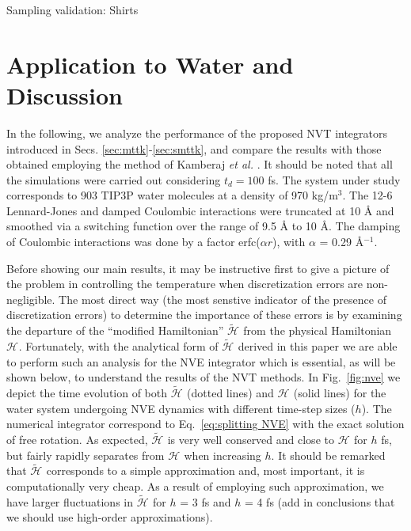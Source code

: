 \documentclass[
journal=jctcce,
layout=twocolumn
]{achemso}
\newcommand{\Ham}[1]{{\mathcal H}_\text{#1}}    %
\newcommand{\timestep}{h}
\newcommand{\modified}[1]{\widetilde{#1}}
\begin{document}
Sampling validation: Shirts \cite{Shirts_2013}

\section{Application to Water and Discussion}
\label{sec:numerical_results}

In the following, we analyze the performance of the proposed NVT integrators introduced in Secs. \ref{sec:mttk}-\ref{sec:smttk}, and  compare the results with those obtained employing the method of Kamberaj \textit{et al.} \cite{Kamberaj_2005}.  It should be noted that all the simulations were carried out considering $t_d = 100$ fs.
The system under study corresponds to 903 TIP3P\cite{Jorgensen_1983} water molecules at a density of 970 kg/m$^3$.
The 12-6 Lennard-Jones and damped Coulombic interactions were truncated at  10 {\AA} and smoothed via a switching function over the range of 9.5 {\AA} to  10 {\AA}.\cite{Silveira_2017} 
The damping of Coulombic interactions was done by a factor erfc($\alpha r$), with $\alpha$ = 0.29 {\AA}$^{-1}$.

Before showing our main results, it may be instructive first to give a picture of the problem in controlling the temperature when discretization errors are non-negligible. 
The most direct way (the most senstive indicator of the presence of discretization errors) to determine the importance of these errors is by examining the departure of the ``modified Hamiltonian'' $\modified{\Ham{}}$ from the physical Hamiltonian $\Ham{}$\cite{Engle_2005}. 
Fortunately, with the analytical form of $\modified{\Ham{}}$ derived in this paper we are able to perform such an analysis for the NVE integrator which is essential, as will be shown below, to understand the results of the NVT methods. 
In Fig.~\ref{fig:nve} we depict the time evolution of both $\modified{\Ham{}}$ (dotted lines) and $\Ham{}$ (solid lines) for the water system undergoing NVE dynamics with different time-step sizes ($\timestep$).
The numerical integrator correspond to Eq.~\ref{eq:splitting NVE} with the exact solution of free rotation. 
As expected, $\modified{\Ham{}}$ is very well conserved and close to $\Ham{}$ for $\timestep$ fs, but fairly rapidly separates from $\Ham{}$ when increasing $\timestep$. 
It should be remarked that $\modified{\Ham{}}$ corresponds to a simple approximation and, most important, it is computationally very cheap. As a result of employing such approximation, we have larger fluctuations in $\modified{\Ham{}}$ for $\timestep$ = 3 fs and $\timestep$ = 4 fs (add in conclusions that we should use high-order approximations).
\end{document}

